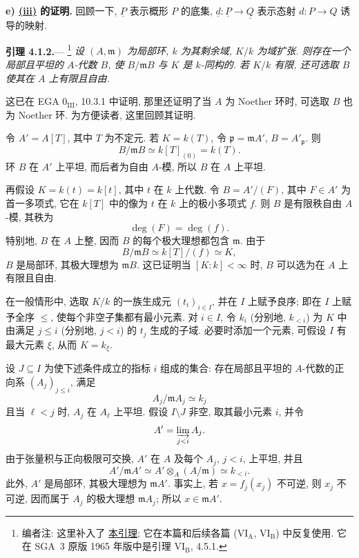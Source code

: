 \medskip
{}\label{proof:sga3-V-4.1-e}%
\noindent\textbf{e) \hyperref[thm:sga3-V-4.1-iii]{(iii)} 的证明.}
回顾一下, \(\underline P\) 表示概形 \(P\) 的底集,
\(\underline d:\underline P\to\underline Q\) 表示态射 \(d:P\to Q\)
诱导的映射.

\medskip
{}\label{lem:sga3-V-4.1.2}%
\noindent\textbf{引理 4.1.2.}---%
\footnote{\label{note:sga3-V-22}编者注:
这里补入了 \hyperref[lem:sga3-V-4.1.2]{本引理};
它在本篇和后续各篇 (\(\mathrm{VI_A}\), \(\mathrm{VI_B}\)) 中反复使用.
它在 SGA~3 原版 1965 年版中是引理 \(\mathrm{VI_B}\), 4.5.1.}
\textit{设 \((A,\mathfrak m)\) 为局部环, \(k\) 为其剩余域,
\(K/k\) 为域扩张. 则存在一个局部且平坦的 \(A\)-代数 \(B\),
使 \(B/\mathfrak mB\) 与 \(K\) 是 \(k\)-同构的.
若 \(K/k\) 有限, 还可选取 \(B\) 使其在 \(A\) 上有限且自由.}

这已在 EGA \(0_{\mathrm{III}}\), 10.3.1 中证明,
那里还证明了当 \(A\) 为 Noether 环时, 可选取 \(B\) 也为 Noether 环.
为方便读者, 这里回顾其证明.

令 \(A'=A[T]\), 其中 \(T\) 为不定元.
若 \(K=k(T)\), 令 \(\mathfrak p=\mathfrak mA'\), \(B=A'_{\mathfrak p}\).
则
\[
  B/\mathfrak mB\simeq k[T]_{(0)}=k(T).
\]
环 \(B\) 在 \(A'\) 上平坦, 而后者为自由 \(A\)-模,
所以 \(B\) 在 \(A\) 上平坦.

再假设 \(K=k(t)=k[t]\), 其中 \(t\) 在 \(k\) 上代数.
令 \(B=A'/(F)\), 其中 \(F\in A'\) 为首一多项式,
它在 \(k[T]\) 中的像为 \(t\) 在 \(k\) 上的极小多项式 \(f\).
则 \(B\) 是有限秩自由 \(A\)-模, 其秩为
\[
  \deg(F)=\deg(f).
\]
特别地, \(B\) 在 \(A\) 上整,
因而 \(B\) 的每个极大理想都包含 \(\mathfrak m\).
由于
\[
  B/\mathfrak mB\simeq k[T]/(f)\simeq K,
\]
\(B\) 是局部环, 其极大理想为 \(\mathfrak mB\).
这已证明当 \([K:k]<\infty\) 时, \(B\) 可以选为在 \(A\) 上有限且自由.

在一般情形中, 选取 \(K/k\) 的一族生成元 \((t_i)_{i\in I}\),
并在 \(I\) 上赋予良序; 即在 \(I\) 上赋予全序 \(\leq\),
使每个非空子集都有最小元素.
对 \(i\in I\), 令 \(k_i\) (分别地, \(k_{<i}\)) 为
\(K\) 中由满足 \(j\leq i\) (分别地, \(j<i\)) 的 \(t_j\)
生成的子域. 必要时添加一个元素, 可假设 \(I\) 有最大元素 \(\xi\),
从而 \(K=k_\xi\).

设 \(J\subseteq I\) 为使下述条件成立的指标 \(i\) 组成的集合:
存在局部且平坦的 \(A\)-代数的正向系 \((A_j)_{j\leq i}\), 满足
\[
  A_j/\mathfrak mA_j\simeq k_j
\]
且当 \(\ell<j\) 时, \(A_j\) 在 \(A_\ell\) 上平坦.
假设 \(I\setminus J\) 非空, 取其最小元素 \(i\), 并令
\[
  A'=\varinjlim_{j<i}A_j.
\]
由于张量积与正向极限可交换, \(A'\) 在 \(A\) 及每个
\(A_j\), \(j<i\), 上平坦, 并且
\[
  A'/\mathfrak mA'
  \simeq A'\otimes_A(A/\mathfrak m)
  \simeq k_{<i}.
\]
此外, \(A'\) 是局部环, 其极大理想为 \(\mathfrak mA'\).
事实上, 若 \(x=f_j(x_j)\) 不可逆,
则 \(x_j\) 不可逆, 因而属于 \(A_j\) 的极大理想 \(\mathfrak mA_j\);
所以 \(x\in\mathfrak mA'\).

